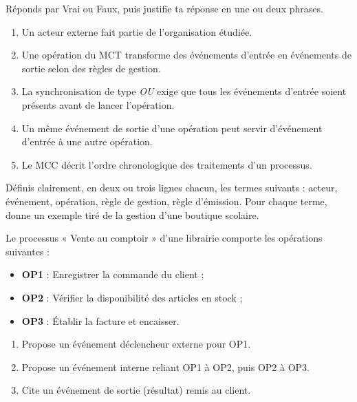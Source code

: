 \documentclass[11pt]{article}
\newcommand{\cle}[1]{{\popxbold\color{popdark}#1}}
\newcounter{popsec}
\newcounter{popsub}
\newcommand{\courssub}[1]{%
  \stepcounter{popsub}%
  \par\vspace{9pt}\noindent{\popxbold\fontsize{11.5}{13}\selectfont\color{popink}{\color{poporange}\thepopsec.\thepopsub}\hspace{6pt}#1}\par\nopagebreak\vspace{4pt}
}
\begin{document}
\begin{exercice}
Réponds par Vrai ou Faux, puis justifie ta réponse en une ou deux phrases.
\begin{enumerate}
\item Un acteur externe fait partie de l'organisation étudiée.
\item Une opération du MCT transforme des événements d'entrée en événements de sortie selon des règles de gestion.
\item La synchronisation de type \emph{OU} exige que tous les événements d'entrée soient présents avant de lancer l'opération.
\item Un même événement de sortie d'une opération peut servir d'événement d'entrée à une autre opération.
\item Le MCC décrit l'ordre chronologique des traitements d'un processus.
\end{enumerate}
\end{exercice}

\begin{exercice}[Définitions]
Définis clairement, en deux ou trois lignes chacun, les termes suivants : \cle{acteur}, \cle{événement}, \cle{opération}, \cle{règle de gestion}, \cle{règle d'émission}. Pour chaque terme, donne un exemple tiré de la gestion d'une boutique scolaire.
\end{exercice}

\begin{exercice}
Le processus « Vente au comptoir » d'une librairie comporte les opérations suivantes :
\begin{itemize}
\item \textbf{OP1} : Enregistrer la commande du client ;
\item \textbf{OP2} : Vérifier la disponibilité des articles en stock ;
\item \textbf{OP3} : Établir la facture et encaisser.
\end{itemize}
\begin{enumerate}
\item Propose un événement déclencheur externe pour OP1.
\item Propose un événement interne reliant OP1 à OP2, puis OP2 à OP3.
\item Cite un événement de sortie (résultat) remis au client.
\end{enumerate}
\end{exercice}

\courssub{Je m'entraîne}
\end{document}
